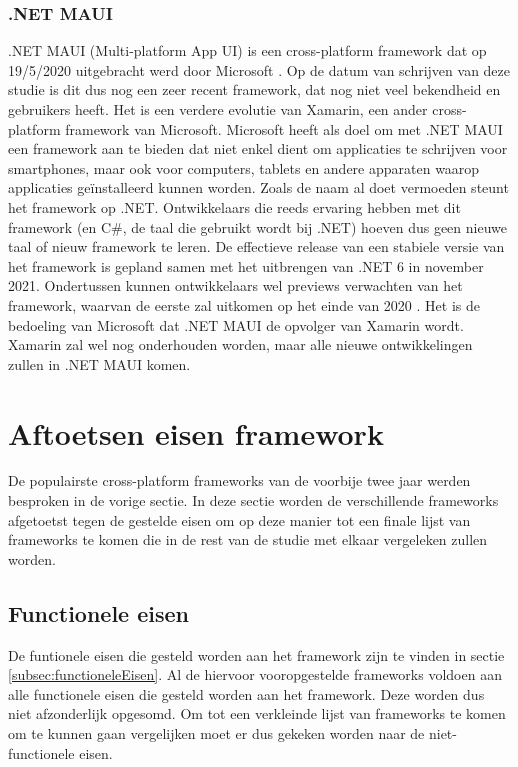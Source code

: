 \subsubsection{.NET MAUI}
\label{subsubsec:.NETMAUI}

.NET MAUI (Multi-platform App UI) is een cross-platform framework dat op 19/5/2020 uitgebracht werd door Microsoft \autocite{Hunter2020}. Op de datum van schrijven van deze studie is dit dus nog een zeer recent framework, dat nog niet veel bekendheid en gebruikers heeft. Het is een verdere evolutie van Xamarin, een ander cross-platform framework van Microsoft. Microsoft heeft als doel om met .NET MAUI een framework aan te bieden dat niet enkel dient om applicaties te schrijven voor smartphones, maar ook voor computers, tablets en andere apparaten waarop applicaties geïnstalleerd kunnen worden. Zoals de naam al doet vermoeden steunt het framework op .NET. Ontwikkelaars die reeds ervaring hebben met dit framework (en C\#, de taal die gebruikt wordt bij .NET) hoeven dus geen nieuwe taal of nieuw framework te leren. De effectieve release van een stabiele versie van het framework is gepland samen met het uitbrengen van .NET 6 in november 2021. Ondertussen kunnen ontwikkelaars wel previews verwachten van het framework, waarvan de eerste zal uitkomen op het einde van 2020 \autocite{Suarez2020}. Het is de bedoeling van Microsoft dat .NET MAUI de opvolger van Xamarin wordt. Xamarin zal wel nog onderhouden worden, maar alle nieuwe ontwikkelingen zullen in .NET MAUI komen.

\section{Aftoetsen eisen framework}
\label{sec:aftoetsenEisen}

De populairste cross-platform frameworks van de voorbije twee jaar werden besproken in de vorige sectie. In deze sectie worden de verschillende frameworks afgetoetst tegen de gestelde eisen om op deze manier tot een finale lijst van frameworks te komen die in de rest van de studie met elkaar vergeleken zullen worden.

\subsection{Functionele eisen}
\label{subsec:aftoetstenFunctioneleEisen}

De funtionele eisen die gesteld worden aan het framework zijn te vinden in sectie \ref{subsec:functioneleEisen}. Al de hiervoor vooropgestelde frameworks voldoen aan alle functionele eisen die gesteld worden aan het framework. Deze worden dus niet afzonderlijk opgesomd. Om tot een verkleinde lijst van frameworks te komen om te kunnen gaan vergelijken moet er dus gekeken worden naar de niet-functionele eisen.

